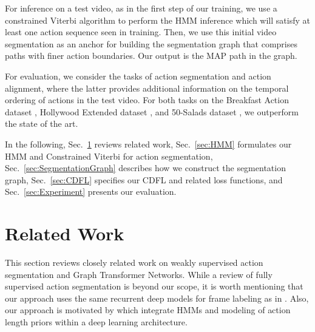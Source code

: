 \documentclass[10pt,twocolumn,letterpaper]{article}
\begin{document}
For inference on a test video, as in the first step of our training, we use a constrained Viterbi algorithm to perform the HMM inference which will satisfy at least one action sequence seen in training. 
Then, we use this initial video segmentation as an anchor for building the segmentation graph that comprises paths with finer action boundaries. Our output is the MAP path in the graph. 

For evaluation, we consider the tasks of action segmentation and action alignment, where the latter provides additional information on the temporal ordering of actions in the test video.  For both tasks on the Breakfast Action dataset \cite{kuehne2014language}, Hollywood Extended dataset \cite{bojanowski2014weakly}, and 50-Salads dataset \cite{stein2013combining}, we outperform the state of the art.





In the following, Sec.~\ref{sec:Related Work} reviews  related work, Sec.~\ref{sec:HMM} formulates our HMM and Constrained Viterbi for action segmentation, Sec.~\ref{sec:SegmentationGraph} describes how we construct the segmentation graph, Sec.~\ref{sec:CDFL} specifies our CDFL and related loss functions, and Sec.~\ref{sec:Experiment} presents our evaluation.




\section{Related Work}\label{sec:Related Work}
This section reviews closely related work on weakly supervised action segmentation and Graph Transformer Networks. While a review of fully supervised action segmentation \cite{yeung2016end, lea2016segmental, rene2017temporal, lei2018temporal} is beyond our scope, it is worth mentioning that our approach uses the same recurrent deep models for frame labeling as in \cite{singh2016multi,yeung2016end, ding2017tricornet}. Also, our approach is motivated by \cite{kuehne2016end, richard2016temporal} which integrate HMMs  and modeling of action length priors  within a deep learning architecture.
\end{document}
